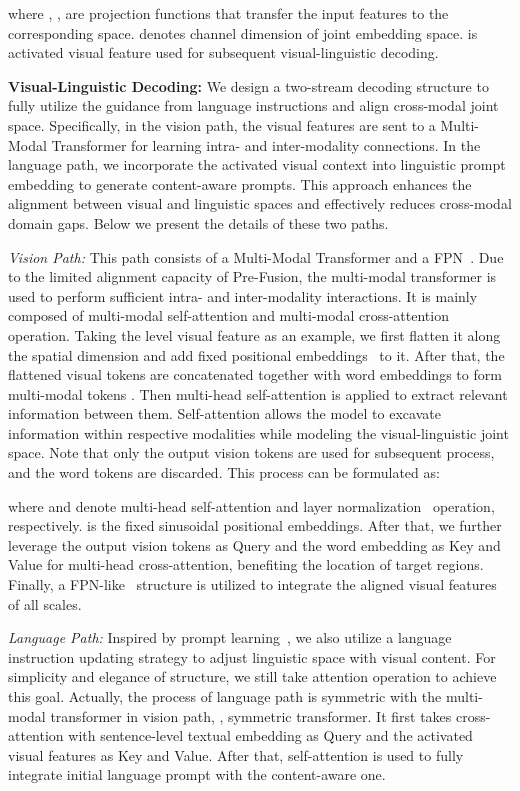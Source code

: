 \documentclass[10pt,twocolumn,letterpaper]{article}
\begin{document}
where , ,  are projection functions that transfer the input features to the corresponding space.  denotes channel dimension of joint embedding space.  is activated visual feature used for subsequent visual-linguistic decoding.

\vspace{5pt}
\noindent \textbf{Visual-Linguistic Decoding:}
We design a two-stream decoding structure to fully utilize the guidance from language instructions and align cross-modal joint space. 
Specifically, in the vision path, the visual features are sent to a Multi-Modal Transformer for learning intra- and inter-modality connections.
In the language path, we incorporate the activated visual context into linguistic prompt embedding to generate content-aware prompts. This approach enhances the alignment between visual and linguistic spaces and effectively reduces cross-modal domain gaps. Below we present the details of these two paths.

\textit{Vision Path:}
This path consists of a Multi-Modal Transformer and a FPN~\cite{fpn}. 
Due to the limited alignment capacity of Pre-Fusion, the multi-modal transformer is used to perform sufficient intra- and inter-modality interactions.
It is mainly composed of multi-modal self-attention and multi-modal cross-attention operation.
Taking the  level visual feature  as an example, we first flatten it along the spatial dimension and add fixed positional embeddings~\cite{detr} to it.
After that, the flattened visual tokens are concatenated together with word embeddings  to form multi-modal tokens .
Then multi-head self-attention is applied to extract relevant information between them.
Self-attention allows the model to excavate information within respective modalities while modeling the visual-linguistic joint  space.
Note that only the output vision tokens  are used for subsequent process, and the word tokens are discarded. 
This process can be formulated as:

where  and  denote multi-head self-attention and layer normalization~\cite{ln} operation, respectively.
 is the fixed sinusoidal positional embeddings.
After that, we further leverage the output vision tokens  as Query and the word embedding  as Key and Value for multi-head cross-attention, benefiting the location of target regions.
Finally, a FPN-like~\cite{fpn} structure is utilized to integrate the aligned visual features of all scales.

\textit{Language Path:}
Inspired by prompt learning~\cite{learned_prompt, learned_prompt2, denseclip}, we also utilize a language instruction updating strategy to adjust linguistic space with visual content.
For simplicity and elegance of structure, we still take attention operation to achieve this goal. 
Actually, the process of language path is symmetric with the multi-modal transformer in vision path, \ie, symmetric transformer. It first takes cross-attention with sentence-level textual embedding  as Query and the activated visual features  as Key and Value. After that, self-attention is used to fully integrate initial language prompt with the content-aware one.
\end{document}
